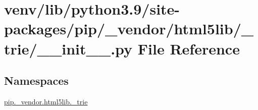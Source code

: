 \hypertarget{venv_2lib_2python3_89_2site-packages_2pip_2__vendor_2html5lib_2__trie_2____init_____8py}{}\section{venv/lib/python3.9/site-\/packages/pip/\+\_\+vendor/html5lib/\+\_\+trie/\+\_\+\+\_\+init\+\_\+\+\_\+.py File Reference}
\label{venv_2lib_2python3_89_2site-packages_2pip_2__vendor_2html5lib_2__trie_2____init_____8py}
\subsection*{Namespaces}
\begin{DoxyCompactItemize}
\item 
 \hyperlink{namespacepip_1_1__vendor_1_1html5lib_1_1__trie}{pip.\+\_\+vendor.\+html5lib.\+\_\+trie}
\end{DoxyCompactItemize}
